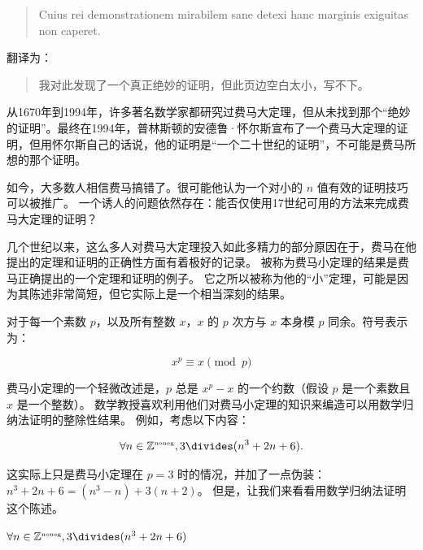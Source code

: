 \begin{quote}
Cuius rei demonstrationem mirabilem sane detexi hanc marginis exiguitas non caperet.
\end{quote}

翻译为：

\begin{quote}
我对此发现了一个真正绝妙的证明，但此页边空白太小，写不下。
\end{quote}

从1670年到1994年，许多著名数学家都研究过费马大定理，但从未找到那个“绝妙的证明”。最终在1994年，普林斯顿的安德鲁·怀尔斯宣布了一个费马大定理的证明，但用怀尔斯自己的话说，他的证明是“一个二十世纪的证明”，不可能是费马所想的那个证明。

如今，大多数人相信费马搞错了。很可能他认为一个对小的 $n$ 值有效的证明技巧可以被推广。
一个诱人的问题依然存在：能否仅使用17世纪可用的方法来完成费马大定理的证明？

几个世纪以来，这么多人对费马大定理投入如此多精力的部分原因在于，费马在他提出的定理和证明的正确性方面有着极好的记录。
被称为费马小定理的结果是费马正确提出的一个定理和证明的例子。
它之所以被称为他的“小”定理，可能是因为其陈述非常简短，但它实际上是一个相当深刻的结果。

\begin{thm}[费马小定理] 
对于每一个素数 $p$，以及所有整数 $x$，$x$ 的 $p$ 次方与 $x$ 本身模 $p$ 同余。符号表示为：

\[ x^p \equiv x \pmod{p} \]
\end{thm}

费马小定理的一个轻微改述是，$p$ 总是 $x^p-x$ 的一个约数（假设 $p$ 是一个素数且 $x$ 是一个整数）。
数学教授喜欢利用他们对费马小定理的知识来编造可以用数学归纳法证明的整除性结果。
例如，考虑以下内容：

\[ \forall n \in \Naturals,  3 \divides (n^3 + 2n + 6).
\]  

这实际上只是费马小定理在 $p=3$ 时的情况，并加了一点伪装：$n^3 + 2n + 6 = (n^3-n)+3(n+2)$。
但是，让我们来看看用数学归纳法证明这个陈述。

\begin{thm} 
$\forall n \in \Naturals,  3 \divides (n^3 + 2n + 6)$
\end{thm}

